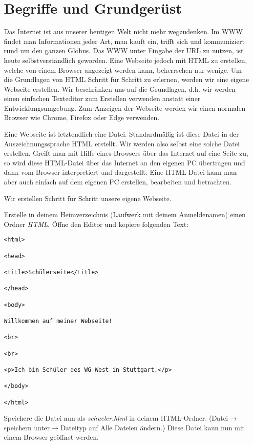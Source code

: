 \section{Begriffe und Grundgerüst}
Das Internet ist aus unserer heutigen Welt nicht mehr wegzudenken. Im WWW findet man Informationen jeder Art, man kauft ein, trifft sich und kommuniziert rund um den ganzen Globus.  Das WWW unter Eingabe der URL zu nutzen, ist heute selbstverständlich geworden. Eine Webseite jedoch mit HTML zu erstellen, welche von einem Browser angezeigt werden kann, beherrschen nur wenige. Um die Grundlagen von HTML Schritt für Schritt zu erlernen, werden wir eine eigene Webseite erstellen. Wir beschränken uns auf die Grundlagen, d.h. wir werden einen einfachen Texteditor zum Erstellen verwenden anstatt einer Entwicklungsumgebung. Zum Anzeigen der Webseite werden wir einen normalen Browser wie Chrome, Firefox oder Edge verwenden.

Eine Webseite ist letztendlich eine Datei. Standardmäßig ist diese Datei in der Auszeichnungssprache HTML erstellt. Wir werden also selbst eine solche Datei erstellen. Greift man mit Hilfe eines Browsers über das Internet auf eine Seite zu, so wird diese HTML-Datei über das Internet an den eigenen PC übertragen und dann vom Browser interpretiert und dargestellt. Eine HTML-Datei kann man aber auch einfach auf dem eigenen PC erstellen, bearbeiten und betrachten.

\begin{Exercise}[title=Für was steht die Abkürzung HTML und was versteht man unter dem Begriff einer Auszeichnungssprache? Die Begriffe maschinenlesbare Sprache und Tag sind hier besonders wichtig., label=Auszeichnungssprache]
\end{Exercise}

Wir erstellen Schritt für Schritt unsere eigene Webseite.

\begin{Exercise}[title=Erstelle deine erste Webseite., label=DateiErstellen]

    Erstelle in deinem Heimverzeichnis (Laufwerk mit deinem Anmeldenamen) einen Ordner \textit{HTML}. Öffne den Editor und kopiere folgenden Text:

    \begin{lstlisting}
<html>

<head>

<title>Schülerseite</title>

</head>

<body>

Willkommen auf meiner Webseite!

<br>

<br>

<p>Ich bin Schüler des WG West in Stuttgart.</p>

</body>

</html>
    \end{lstlisting}
    Speichere die Datei nun als \textit{schueler.html} in deinem HTML-Ordner. (Datei\(\rightarrow\)speichern unter\(\rightarrow\)Dateityp auf Alle Dateien ändern.)
    Diese Datei kann nun mit einem Browser geöffnet werden.
\end{Exercise}

